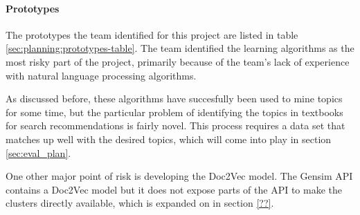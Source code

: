 
\paragraph{Prototypes}
The prototypes the team identified for this project are listed in
table \ref{sec:planning:prototypes-table}.
The team identified the learning algorithms as the most risky part of
the project, primarily because of the team's lack of experience
with natural language processing algorithms.  

As discussed before, these algorithms have succesfully been used to
mine topics for some time, but the particular problem of identifying
the topics in textbooks for search recommendations is fairly novel.
This process requires a data set that matches up well with the desired
topics, which will come into play in section \ref{sec:eval_plan}.

One other major point of risk is developing the Doc2Vec model.
The Gensim API contains a Doc2Vec model but it does not expose parts
of the API to make the clusters directly available, which is expanded
on in section \ref{??}.


